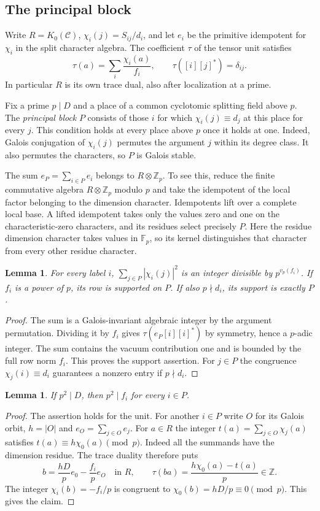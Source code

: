 \documentclass[11pt]{amsart}
\numberwithin{equation}{section}
\newtheorem{lemma}[theorem]{Lemma}
\begin{document}
\subsection{The principal block}
\label{blk:principal}
Write $R=K_0(\mathcal C)$, $\chi_i(j)=S_{ij}/d_i$, and let $e_i$ be the primitive idempotent for $\chi_i$ in the split character algebra. The coefficient $\tau$ of the tensor unit satisfies
\[
 \tau(a)=\sum_i\frac{\chi_i(a)}{f_i},\qquad
 \tau([i][j]^*)=\delta_{ij}.
\]
In particular $R$ is its own trace dual, also after localization at a prime.

Fix a prime $p\mid D$ and a place of a common cyclotomic splitting field above $p$. The \emph{principal block} $P$ consists of those $i$ for which $\chi_i(j)\equiv d_j$ at this place for every $j$. This condition holds at every place above $p$ once it holds at one. Indeed, Galois conjugation of $\chi_i(j)$ permutes the argument $j$ within its degree class. It also permutes the characters, so $P$ is Galois stable.

The sum $e_P=\sum_{i\in P}e_i$ belongs to $R\otimes\mathbb Z_p$. To see this, reduce the finite commutative algebra $R\otimes\mathbb Z_p$ modulo $p$ and take the idempotent of the local factor belonging to the dimension character. Idempotents lift over a complete local base. A lifted idempotent takes only the values zero and one on the characteristic-zero characters, and its residues select precisely $P$. Here the residue dimension character takes values in $\mathbb F_p$, so its kernel distinguishes that character from every other residue character.

\begin{lemma}\label{blk:support}
For every label $i$, $\sum_{j\in P}|\chi_i(j)|^2$ is an integer divisible by $p^{v_p(f_i)}$. If $f_i$ is a power of $p$, its row is supported on $P$. If also $p\nmid d_i$, its support is exactly $P$.
\end{lemma}
\begin{proof}
The sum is a Galois-invariant algebraic integer by the argument permutation. Dividing it by $f_i$ gives $\tau(e_P[i][i]^*)$ by symmetry, hence a $p$-adic integer. The sum contains the vacuum contribution one and is bounded by the full row norm $f_i$. This proves the support assertion. For $j\in P$ the congruence $\chi_j(i)\equiv d_i$ guarantees a nonzero entry if $p\nmid d_i$.
\end{proof}

\begin{lemma}\label{blk:height}
If $p^2\mid D$, then $p^2\mid f_i$ for every $i\in P$.
\end{lemma}
\begin{proof}
The assertion holds for the unit. For another $i\in P$ write $O$ for its Galois orbit, $h=|O|$ and $e_O=\sum_{j\in O}e_j$. For $a\in R$ the integer $t(a)=\sum_{j\in O}\chi_j(a)$ satisfies $t(a)\equiv h\chi_0(a)\pmod p$. Indeed all the summands have the dimension residue. The trace duality therefore puts
\[
 b=\frac{hD}{p}e_0-\frac{f_i}{p}e_O\quad\text{in }R,
 \qquad
 \tau(ba)=\frac{h\chi_0(a)-t(a)}{p}\in\mathbb Z .
\]
The integer $\chi_i(b)=-f_i/p$ is congruent to $\chi_0(b)=hD/p\equiv0\pmod p$. This gives the claim.
\end{proof}
\end{document}
